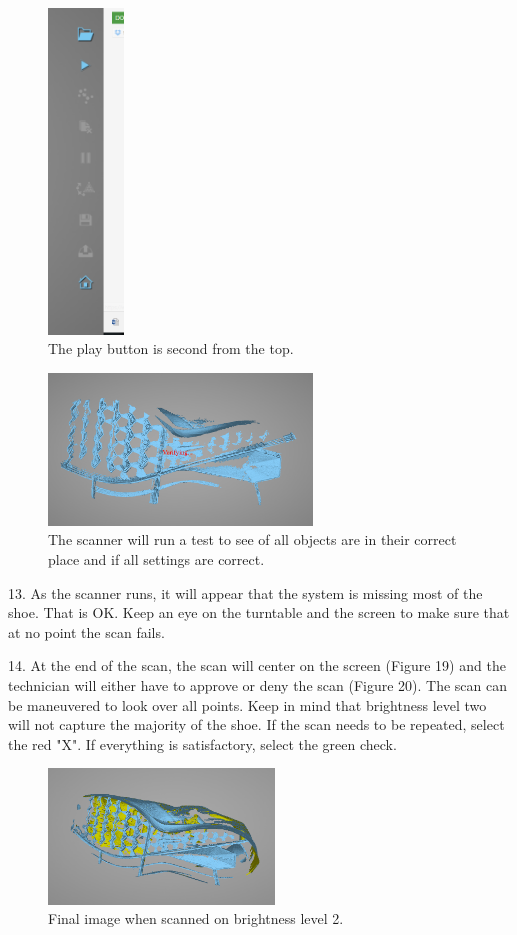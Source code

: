 \begin{figure}[!htp]
\centering
\includegraphics[width=2cm]{Tool_Bar_1}
\caption{The play button is second from the top.}
\label{Image 17}
\end{figure}


\begin{figure}[!htp]
\centering
\includegraphics[width=7cm]{Ver}
\caption{The scanner will run a test to see of all objects are in their correct place and if all settings are correct.}
\label{Image 18}
\end{figure}

\newpage

13. As the scanner runs, it will appear that the system is missing most of the shoe. That is OK. Keep an eye on the turntable and the screen to make sure that at no point the scan fails.  

14. At the end of the scan, the scan will center on the screen (Figure 19) and the technician will either have to approve or deny the scan (Figure 20). The scan can be maneuvered to look over all points. Keep in mind that brightness level two will not capture the majority of the shoe. If the scan needs to be repeated, select the red "X". If everything is satisfactory, select the green check.  

\begin{figure}[!htp]
\centering
\includegraphics[width=6cm]{2}
\caption{Final image when scanned on brightness level 2.}
\label{Image 19}
\end{figure}

